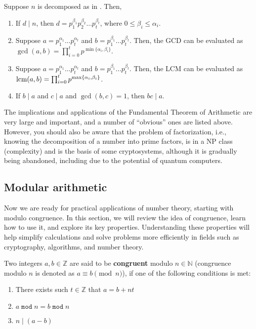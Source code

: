 \documentclass[../lecture-notes-148x210.tex]{subfiles}
\begin{document}
\begin{corollary}
    Suppose $n$ is decomposed as in . Then,

    \begin{enumerate}
        \item If $d \mid n$, then $d = p_{1}^{\beta_1}p_{2}^{\beta_2} \dots p_{t}^{\beta_t}$, where $0 \leq \beta_i \leq \alpha_i$.
        \item Suppose $a = p_{1}^{\alpha_1} \dots p_{t}^{\alpha_t}$ and $b = p_{1}^{\beta_1} \dots p_{t}^{\beta_t}$. Then, the GCD can be evaluated as $\gcd(a, b) = \prod_{i=0}^{t}p^{\min\{\alpha_i, \beta_i\}}$.
        \item Suppose $a = p_{1}^{\alpha_1} \dots p_{t}^{\alpha_t}$ and $b = p_{1}^{\beta_1} \dots p_{t}^{\beta_t}$. Then, the LCM can be evaluated as $\text{lcm}(a, b) = \prod_{i=0}^{t}p^{\max\{\alpha_i, \beta_i\}}$.
        \item If $b \mid a$ and $c \mid a$ and $\gcd(b, c) = 1$, then $bc \mid a$.
    \end{enumerate}
\end{corollary}

The implications and applications of the Fundamental Theorem of Arithmetic are very large and important, and a number of “obvious” ones are listed above.
However, you should also be aware that the problem of factorization, i.e., knowing the decomposition of a number into prime factors, is in a NP class (complexity) and is the basis of some cryptosystems, although it is gradually being abandoned, including due to the potential of quantum computers.

\subsection{Modular arithmetic}

Now we are ready for practical applications of number theory, starting with modulo congruence.
In this section, we will review the idea of congruence, learn how to use it, and explore
its key properties. Understanding these properties will help simplify calculations and solve 
problems more efficiently in fields such as cryptography, algorithms, and number theory.

\begin{definition}
    Two integers $a, b \in \mathbb{Z}$ are said to be \textbf{congruent} modulo $n \in \mathbb{N}$ (congruence modulo $n$ is denoted as $a \equiv b \pmod{n}$), if one of the following conditions is met:
    \begin{enumerate}
        \item There exists such $t \in \mathbb{Z}$ that $a = b + nt$
        \item $a \; \texttt{mod} \; n = b \; \texttt{mod} \; n$
        \item $n \mid (a - b)$
    \end{enumerate}
\end{definition}
\end{document}
